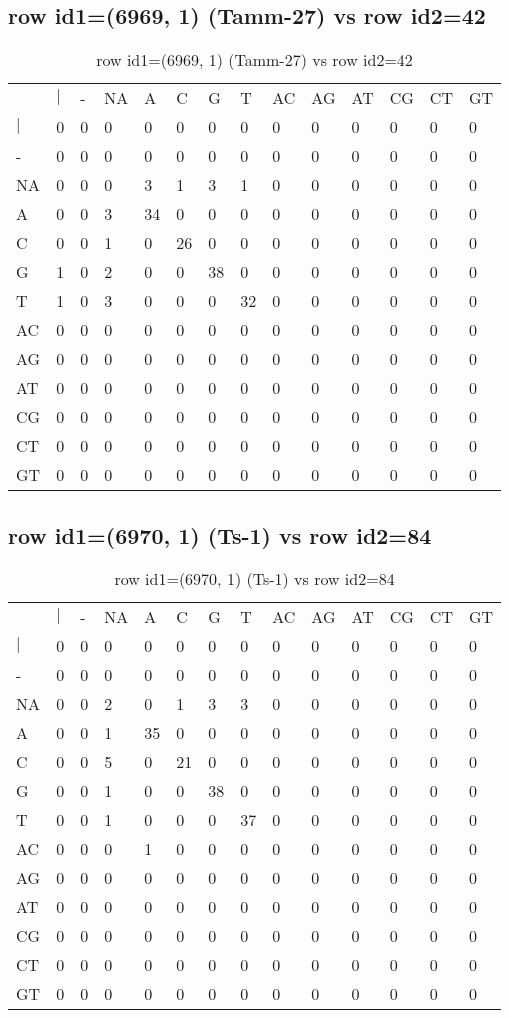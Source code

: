 \subsection{row id1=(6969, 1) (Tamm-27) vs row id2=42}
\begin{center}
\begin{longtable}{|l|l|l|l|l|l|l|l|l|l|l|l|l|l|}
\caption{row id1=(6969, 1) (Tamm-27) vs row id2=42} \label{table_dm186}\\
\hline
\\
\hline
&$|$&-&NA&A&C&G&T&AC&AG&AT&CG&CT&GT\\
$|$&0&0&0&0&0&0&0&0&0&0&0&0&0\\
-&0&0&0&0&0&0&0&0&0&0&0&0&0\\
NA&0&0&0&3&1&3&1&0&0&0&0&0&0\\
A&0&0&3&34&0&0&0&0&0&0&0&0&0\\
C&0&0&1&0&26&0&0&0&0&0&0&0&0\\
G&1&0&2&0&0&38&0&0&0&0&0&0&0\\
T&1&0&3&0&0&0&32&0&0&0&0&0&0\\
AC&0&0&0&0&0&0&0&0&0&0&0&0&0\\
AG&0&0&0&0&0&0&0&0&0&0&0&0&0\\
AT&0&0&0&0&0&0&0&0&0&0&0&0&0\\
CG&0&0&0&0&0&0&0&0&0&0&0&0&0\\
CT&0&0&0&0&0&0&0&0&0&0&0&0&0\\
GT&0&0&0&0&0&0&0&0&0&0&0&0&0\\
\hline
\end{longtable}
\end{center}

\subsection{row id1=(6970, 1) (Ts-1) vs row id2=84}
\begin{center}
\begin{longtable}{|l|l|l|l|l|l|l|l|l|l|l|l|l|l|}
\caption{row id1=(6970, 1) (Ts-1) vs row id2=84} \label{table_dm188}\\
\hline
\\
\hline
&$|$&-&NA&A&C&G&T&AC&AG&AT&CG&CT&GT\\
$|$&0&0&0&0&0&0&0&0&0&0&0&0&0\\
-&0&0&0&0&0&0&0&0&0&0&0&0&0\\
NA&0&0&2&0&1&3&3&0&0&0&0&0&0\\
A&0&0&1&35&0&0&0&0&0&0&0&0&0\\
C&0&0&5&0&21&0&0&0&0&0&0&0&0\\
G&0&0&1&0&0&38&0&0&0&0&0&0&0\\
T&0&0&1&0&0&0&37&0&0&0&0&0&0\\
AC&0&0&0&1&0&0&0&0&0&0&0&0&0\\
AG&0&0&0&0&0&0&0&0&0&0&0&0&0\\
AT&0&0&0&0&0&0&0&0&0&0&0&0&0\\
CG&0&0&0&0&0&0&0&0&0&0&0&0&0\\
CT&0&0&0&0&0&0&0&0&0&0&0&0&0\\
GT&0&0&0&0&0&0&0&0&0&0&0&0&0\\
\hline
\end{longtable}
\end{center}

